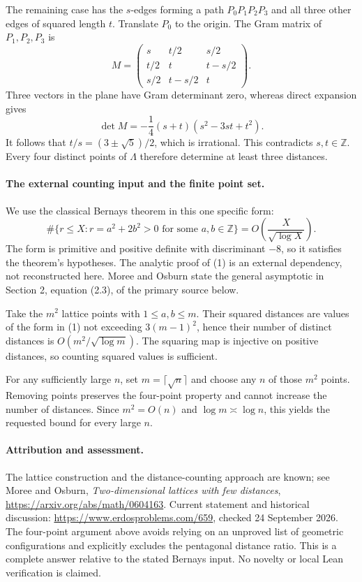 The remaining case has the \(s\)-edges forming a path \(P_0P_1P_2P_3\) and all three other edges of squared length \(t\). Translate \(P_0\) to the origin. The Gram matrix of \(P_1,P_2,P_3\) is
\[
 M=\begin{pmatrix}
 s&t/2&s/2\\
 t/2&t&t-s/2\\
 s/2&t-s/2&t
 \end{pmatrix}.
\]
Three vectors in the plane have Gram determinant zero, whereas direct expansion gives
\[
 \det M=-\frac14(s+t)(s^2-3st+t^2).
\]
It follows that \(t/s=(3\pm\sqrt5)/2\), which is irrational. This contradicts \(s,t\in\mathbb Z\). Every four distinct points of \(\Lambda\) therefore determine at least three distances.

\paragraph{The external counting input and the finite point set.}
We use the classical Bernays theorem in this one specific form:
\[
 \#\{r\leq X:r=a^2+2b^2>0\text{ for some }a,b\in\mathbb Z\}
 =O\left(\frac X{\sqrt{\log X}}\right). \tag{1}
\]
The form is primitive and positive definite with discriminant \(-8\), so it satisfies the theorem's hypotheses. The analytic proof of (1) is an external dependency, not reconstructed here. Moree and Osburn state the general asymptotic in Section 2, equation (2.3), of the primary source below.

Take the \(m^2\) lattice points with \(1\leq a,b\leq m\). Their squared distances are values of the form in (1) not exceeding \(3(m-1)^2\), hence their number of distinct distances is \(O(m^2/\sqrt{\log m})\). The squaring map is injective on positive distances, so counting squared values is sufficient.

For any sufficiently large \(n\), set \(m=\lceil\sqrt n\rceil\) and choose any \(n\) of those \(m^2\) points. Removing points preserves the four-point property and cannot increase the number of distances. Since \(m^2=O(n)\) and \(\log m\asymp\log n\), this yields the requested bound for every large \(n\).

\paragraph{Attribution and assessment.}
The lattice construction and the distance-counting approach are known; see Moree and Osburn, \emph{Two-dimensional lattices with few distances}, \url{https://arxiv.org/abs/math/0604163}. Current statement and historical discussion: \url{https://www.erdosproblems.com/659}, checked 24 September 2026. The four-point argument above avoids relying on an unproved list of geometric configurations and explicitly excludes the pentagonal distance ratio. This is a complete answer relative to the stated Bernays input. No novelty or local Lean verification is claimed.
